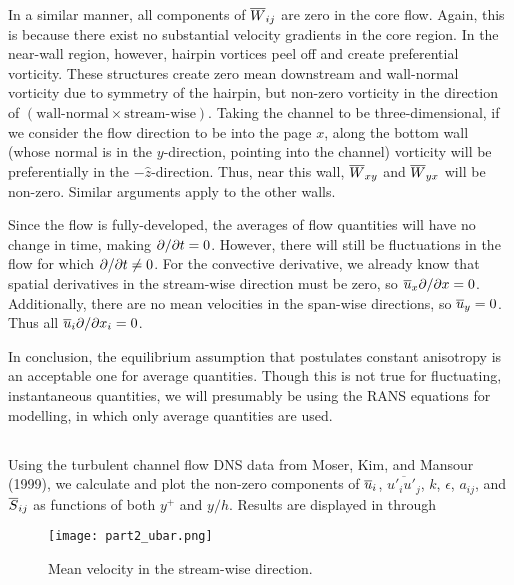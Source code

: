 \documentclass[11pt]{article}
\begin{document}
In a similar manner, all components of $\overline{W}_{ij}$ are zero in the core flow. Again, this is because there exist no substantial velocity gradients in the core region. In the near-wall region, however, hairpin vortices peel off and create preferential vorticity. These structures create zero mean downstream and wall-normal vorticity due to symmetry of the hairpin, but non-zero vorticity in the direction of $(\text{wall-normal} \times \text{stream-wise})$. Taking the channel to be three-dimensional, if we consider the flow direction to be into the page $x$, along the bottom wall (whose normal is in the $y$-direction, pointing into the channel) vorticity will be preferentially in the $-\hat{z}$-direction. Thus, near this wall, $\overline{W}_{xy}$ and $\overline{W}_{yx}$ will be non-zero. Similar arguments apply to the other walls.

Since the flow is fully-developed, the averages of flow quantities will have no change in time, making $\partial  / \partial t=0$. However, there will still be fluctuations in the flow for which $\partial  / \partial t \neq 0$. For the convective derivative, we already know that spatial derivatives in the stream-wise direction must be zero, so $\overline{u}_x \partial  / \partial x=0$. Additionally, there are no mean velocities in the span-wise directions, so $\overline{u}_y=0$. Thus all $\overline{u}_i \partial  / \partial x_i=0$.

In conclusion, the equilibrium assumption that postulates constant anisotropy is an acceptable one for average quantities. Though this is not true for fluctuating, instantaneous quantities, we will presumably be using the RANS equations for modelling, in which only average quantities are used.

\subsection{}

Using the turbulent channel flow DNS data from Moser, Kim, and Mansour (1999), we calculate and plot the non-zero components of $\overline{u}_i$, $\overline{u'_i u'_j}$, $k$, $\epsilon$, $a_{ij}$, and $\overline{S}_{ij}$ as functions of both $y^+$ and $y/h$. Results are displayed in  through 

\begin{figure}[p]
\centering
\texttt{[image: part2\_ubar.png]}
\vspace{6pt}
\caption{Mean velocity in the stream-wise direction.}
\label{fig:part2_ubar}
\end{figure}
\end{document}
